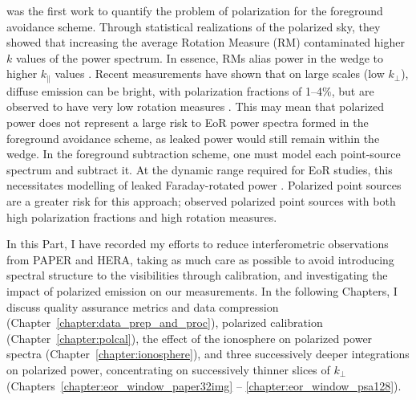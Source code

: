 \cite{Moore.13} was the first work to quantify the problem of polarization for the foreground avoidance scheme. Through statistical realizations of the polarized sky, they showed that increasing the average Rotation Measure (RM) contaminated higher $k$ values of the power spectrum. In essence, RMs alias power in the wedge to higher $k_{\parallel}$ values \citep{Nunhokee.17}. Recent measurements have shown that on large scales (low $k_{\perp}$), diffuse emission can be bright, with polarization fractions of 1--4\%, but are observed to have very low rotation measures \citep{Bernardi.13, Lenc.16}. This may mean that polarized power does not represent a large risk to EoR power spectra formed in the foreground avoidance scheme, as leaked power would still remain within the wedge. In the foreground subtraction scheme, one must model each point-source spectrum and subtract it. At the dynamic range required for EoR studies, this necessitates modelling of leaked Faraday-rotated power \citep[e.g.][]{Jelic.14}. Polarized point sources are a greater risk for this approach; \cite{VanEck.18} observed polarized point sources with both high polarization fractions and high rotation measures.

In this Part, I have recorded my efforts to reduce interferometric observations from PAPER and HERA, taking as much care as possible to avoid introducing spectral structure to the visibilities through calibration, and investigating the impact of polarized emission on our measurements. In the following Chapters, I discuss quality assurance metrics and data compression (Chapter~\ref{chapter:data_prep_and_proc}), polarized calibration (Chapter~\ref{chapter:polcal}), the effect of the ionosphere on polarized power spectra (Chapter~\ref{chapter:ionosphere}), and three successively deeper integrations on polarized power, concentrating on successively thinner slices of $k_{\perp}$ (Chapters~\ref{chapter:eor_window_paper32img} -- \ref{chapter:eor_window_psa128}).